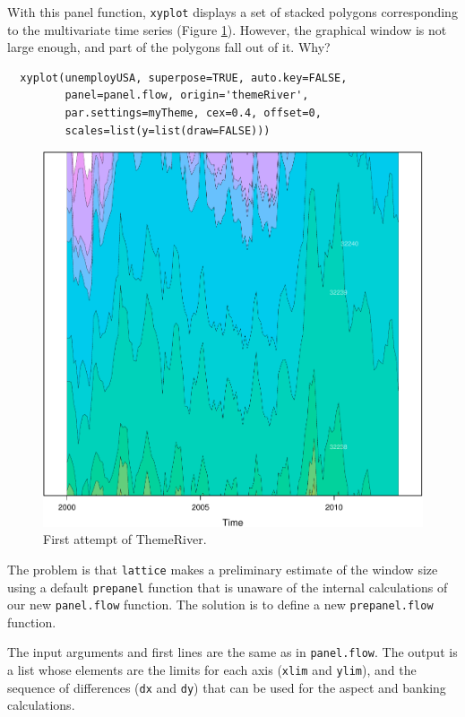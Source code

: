 \documentclass[smallroyalvopaper]{memoir}
\begin{document}
With this panel function, \texttt{xyplot} displays a set of stacked
polygons corresponding to the multivariate time series (Figure
\ref{fig:themeRiverError}). However, the graphical window is not
large enough, and part of the polygons fall out of it. Why?

\lstset{language=r,label= ,caption= ,captionpos=b,numbers=none}
\begin{lstlisting}
  xyplot(unemployUSA, superpose=TRUE, auto.key=FALSE,
         panel=panel.flow, origin='themeRiver',
         par.settings=myTheme, cex=0.4, offset=0,
         scales=list(y=list(draw=FALSE)))
\end{lstlisting}

\begin{figure}[htbp]
\centering
\includegraphics[height=0.45\textheight]{figs/ThemeRiverError.pdf}
\caption{First attempt of ThemeRiver. \label{fig:themeRiverError}}
\end{figure}

The problem is that \texttt{lattice} makes a preliminary estimate of the
window size using a default \texttt{prepanel} function that is unaware of the
internal calculations of our new \texttt{panel.flow} function. The solution
is to define a new \texttt{prepanel.flow} function. 

The input arguments and first lines are the same as in
\texttt{panel.flow}. The output is a list whose elements are the limits for
each axis (\texttt{xlim} and \texttt{ylim}), and the sequence of differences (\texttt{dx}
and \texttt{dy}) that can be used for the aspect and banking
calculations. 
\end{document}
